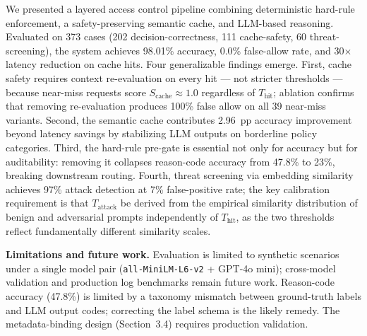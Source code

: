 \documentclass[runningheads]{llncs}
\begin{document}
We presented a layered access control pipeline combining deterministic hard-rule enforcement, a safety-preserving semantic cache, and LLM-based reasoning. Evaluated on 373 cases (202 decision-correctness, 111 cache-safety, 60 threat-screening), the system achieves 98.01\% accuracy, 0.0\% false-allow rate, and 30$\times$ latency reduction on cache hits. Four generalizable findings emerge. First, cache safety requires context re-evaluation on every hit --- not stricter thresholds --- because near-miss requests score $S_{\text{cache}} \approx 1.0$ regardless of $T_{\text{hit}}$; ablation confirms that removing re-evaluation produces 100\% false allow on all 39 near-miss variants. Second, the semantic cache contributes 2.96~pp accuracy improvement beyond latency savings by stabilizing LLM outputs on borderline policy categories. Third, the hard-rule pre-gate is essential not only for accuracy but for auditability: removing it collapses reason-code accuracy from 47.8\% to 23\%, breaking downstream routing. Fourth, threat screening via embedding similarity achieves 97\% attack detection at 7\% false-positive rate; the key calibration requirement is that $T_{\text{attack}}$ be derived from the empirical similarity distribution of benign and adversarial prompts independently of $T_{\text{hit}}$, as the two thresholds reflect fundamentally different similarity scales.

\noindent\textbf{Limitations and future work.} Evaluation is limited to synthetic scenarios under a single model pair (\texttt{all-MiniLM-L6-v2} + GPT-4o mini); cross-model validation and production log benchmarks remain future work. Reason-code accuracy (47.8\%) is limited by a taxonomy mismatch between ground-truth labels and LLM output codes; correcting the label schema is the likely remedy. The metadata-binding design (Section~3.4) requires production validation.
\end{document}
